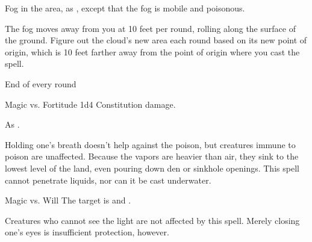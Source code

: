 \begin{spellheader}
    \spelldur{\durshort}
\end{spellheader}
\begin{spelleffects}
    \spelleffect Fog in the area, as , except that the fog is mobile and poisonous.

    \par The fog moves away from you at 10 feet per round, rolling along the surface of the ground. Figure out the cloud's new area each round based on its new point of origin, which is 10 feet farther away from the point of origin where you cast the spell.
    \begin{spelltrigger}{End of every round}
        \begin{spellattack}{Magic vs. Fortitude}
            \spellsuccess 1d4 Constitution damage.
        \end{spellattack}
    \end{spelltrigger}
\end{spelleffects}
\begin{spellfooter}
    \spellnotes As .

    Holding one's breath doesn't help against the poison, but creatures immune to poison are unaffected. Because the vapors are heavier than air, they sink to the lowest level of the land, even pouring down den or sinkhole openings. This spell cannot penetrate liquids, nor can it be cast underwater.
\end{spellfooter}

\begin{spellheader}
\end{spellheader}
\begin{spelleffects}
    \begin{spellattack}{Magic vs. Will}
        \spellsuccess The target is \dazzled and \bewildered.
    \end{spellattack}
\end{spelleffects}
\begin{spellfooter}
    \spellnotes Creatures who cannot see the light are not affected by this spell. Merely closing one's eyes is insufficient protection, however.
\end{spellfooter}

